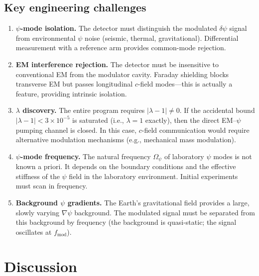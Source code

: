 \documentclass[aps,prd,twocolumn,superscriptaddress,nofootinbib,floatfix]{revtex4-2}
\newcommand{\psifield}{\psi}
\newcommand{\ee}[1]{\times 10^{#1}}
\begin{document}
\subsection{Key engineering challenges}
\label{subsec:challenges}

\begin{enumerate}
\item \textbf{$\psifield$-mode isolation.} The detector must
distinguish the modulated $\delta\psifield$ signal from environmental
$\psifield$ noise (seismic, thermal, gravitational). Differential
measurement with a reference arm provides common-mode rejection.

\item \textbf{EM interference rejection.} The detector must be
insensitive to conventional EM from the modulator cavity. Faraday
shielding blocks transverse EM but passes longitudinal $c$-field
modes---this is actually a feature, providing intrinsic isolation.

\item \textbf{$\lambda$ discovery.} The entire program requires
$|\lambda-1| \neq 0$. If the accidental bound
$|\lambda-1| < 3\ee{-5}$ is saturated (i.e., $\lambda = 1$
exactly), then the direct EM--$\psifield$ pumping channel is
closed. In this case, $c$-field communication would require
alternative modulation mechanisms (e.g., mechanical mass
modulation).

\item \textbf{$\psifield$-mode frequency.} The natural frequency
$\Omega_\psi$ of laboratory $\psifield$ modes is not known a
priori. It depends on the boundary conditions and the effective
stiffness of the $\psifield$ field in the laboratory environment.
Initial experiments must scan in frequency.

\item \textbf{Background $\psifield$ gradients.} The Earth's
gravitational field provides a large, slowly varying
$\nabla\psifield$ background. The modulated signal must be
separated from this background by frequency (the background is
quasi-static; the signal oscillates at $f_{\text{mod}}$).
\end{enumerate}

\section{Discussion}
\label{sec:discussion}
\end{document}
